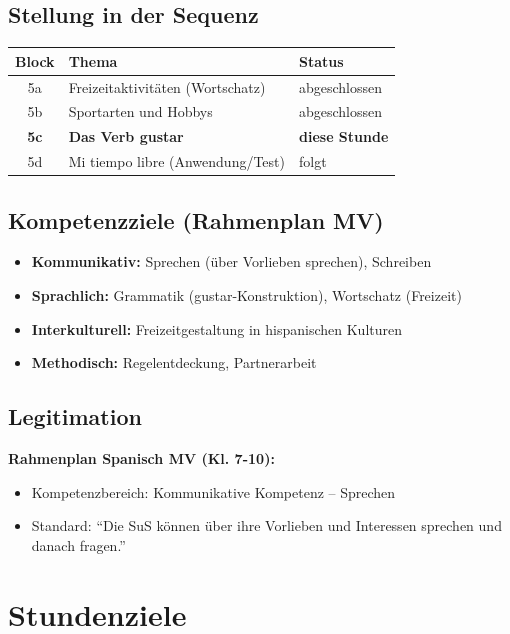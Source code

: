 \documentclass[11pt,a4paper]{article}
\begin{document}
\subsection{Stellung in der Sequenz}
\begin{tabular}{|c|l|l|}
\hline
\textbf{Block} & \textbf{Thema} & \textbf{Status} \\
\hline
5a & Freizeitaktivitäten (Wortschatz) & abgeschlossen \\
5b & Sportarten und Hobbys & abgeschlossen \\
\textbf{5c} & \textbf{Das Verb gustar} & \textbf{diese Stunde} \\
5d & Mi tiempo libre (Anwendung/Test) & folgt \\
\hline
\end{tabular}

\subsection{Kompetenzziele (Rahmenplan MV)}
\begin{itemize}
    \item \textbf{Kommunikativ:} Sprechen (über Vorlieben sprechen), Schreiben
    \item \textbf{Sprachlich:} Grammatik (gustar-Konstruktion), Wortschatz (Freizeit)
    \item \textbf{Interkulturell:} Freizeitgestaltung in hispanischen Kulturen
    \item \textbf{Methodisch:} Regelentdeckung, Partnerarbeit
\end{itemize}

\subsection{Legitimation}
\textbf{Rahmenplan Spanisch MV (Kl. 7-10):}
\begin{itemize}
    \item Kompetenzbereich: Kommunikative Kompetenz -- Sprechen
    \item Standard: ``Die SuS können über ihre Vorlieben und Interessen sprechen und danach fragen.''
\end{itemize}

\section{Stundenziele}
\end{document}
